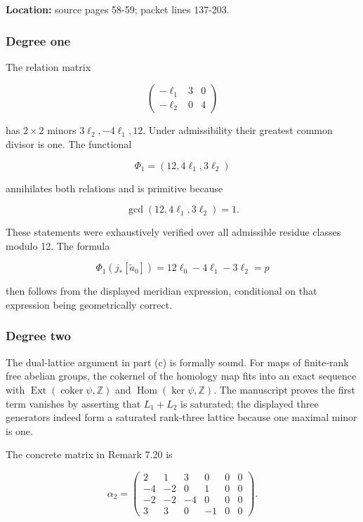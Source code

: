 \documentclass[
  10pt,
]{article}
\begin{document}
\textbf{Location:} source pages 58-59; packet lines 137-203.

\subsubsection{Degree one}\label{degree-one}

The relation matrix

\[
\begin{pmatrix}
-\ell_1&3&0\\
-\ell_2&0&4
\end{pmatrix}
\]

has \(2\times2\) minors \(3\ell_2,-4\ell_1,12\). Under admissibility
their greatest common divisor is one. The functional

\[
\Phi_1=(12,4\ell_1,3\ell_2)
\]

annihilates both relations and is primitive because

\[
\gcd(12,4\ell_1,3\ell_2)=1.
\]

These statements were exhaustively verified over all admissible residue
classes modulo 12. The formula

\[
\Phi_1(j_*[\widetilde a_0])
 =12\ell_0-4\ell_1-3\ell_2=p
\]

then follows from the displayed meridian expression, conditional on that
expression being geometrically correct.

\subsubsection{Degree two}\label{degree-two}

The dual-lattice argument in part (c) is formally sound. For maps of
finite-rank free abelian groups, the cokernel of the homology map fits
into an exact sequence with
\(\operatorname{Ext}(\operatorname{coker}\psi,\mathbb Z)\) and
\(\operatorname{Hom}(\ker\psi,\mathbb Z)\). The manuscript proves the
first term vanishes by asserting that \(L_1+L_2\) is saturated; the
displayed three generators indeed form a saturated rank-three lattice
because one maximal minor is one.

The concrete matrix in Remark 7.20 is

\[
\alpha_2=
\begin{pmatrix}
2&1&3&0&0&0\\
-4&-2&0&1&0&0\\
-2&-2&-4&0&0&0\\
3&3&0&-1&0&0
\end{pmatrix}.
\]
\end{document}
